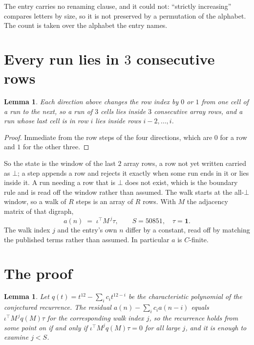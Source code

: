 \documentclass[11pt,a4paper]{article}
\theoremstyle{plain}
\newtheorem{lemma}[theorem]{Lemma}
\theoremstyle{definition}
\begin{document}
The entry carries no renaming clause, and it could not: ``strictly increasing'' compares
letters by size, so it is not preserved by a permutation of the alphabet. The count is taken
over the alphabet the entry names.

\section{Every run lies in $3$ consecutive rows}

\begin{lemma}\label{lem:win}
Each direction above changes the row index by $0$ or $1$ from one cell of a run to the next, so
a run of $3$ cells lies inside $3$ consecutive array rows, and a run whose last cell is in
row $i$ lies inside rows $i-2,\dots,i$.
\end{lemma}

\begin{proof}
Immediate from the row steps of the four directions, which are $0$ for a row and $1$ for the
other three.
\end{proof}

So the state is the window of the last $2$ array rows, a row not yet written carried as
$\bot$; a step appends a row and rejects it exactly when some run ends in it or lies inside it.
A run needing a row that is $\bot$ does not exist, which is the boundary rule and is read off
the window rather than assumed. The walk starts at the all-$\bot$ window, so a walk of $R$ steps
is an array of $R$ rows. With $M$ the adjacency matrix of that digraph,
\[
a(n)\;=\;\iota^{\!\top}M^{\,j}\tau ,\qquad S=50851,\quad\tau=\mathbf{1} .
\]
The walk index $j$ and the entry's own $n$ differ by a constant, read off by matching the
published terms rather than assumed. In particular $a$ is $C$-finite.

\section{The proof}

\begin{lemma}\label{lem:crit}
Let $q(t)=t^{12}-\sum_i c_it^{12-i}$ be the characteristic polynomial of the
conjectured recurrence. The residual $a(n)-\sum_ic_ia(n-i)$ equals
$\iota^{\!\top}M^{\,j}q(M)\tau$ for the corresponding walk index $j$, so the recurrence
holds from some point on if and only if $\iota^{\!\top}M^{j}q(M)\tau=0$ for all large $j$,
and it is enough to examine $j<S$.
\end{lemma}
\end{document}
